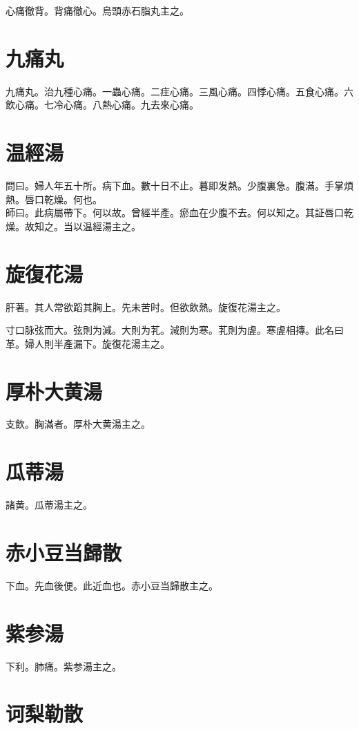 \documentclass[b5paper,twoside,zihao=-4,UTF8]{ctexbook}
\begin{document}
心痛徹背。背痛徹心。烏頭赤石脂丸主之。

\section{九痛丸}

九痛丸。治九種心痛。一蟲心痛。二疰心痛。三風心痛。四悸心痛。五食心痛。六飲心痛。七冷心痛。八熱心痛。九去來心痛。

\section{温經湯}

問曰。婦人年五十所。病下血。數十日不止。暮即发熱。少腹裏急。腹滿。手掌煩熱。唇口乾燥。何也。\\
師曰。此病屬帶下。何以故。曾經半產。瘀血在少腹不去。何以知之。其証唇口乾燥。故知之。当以温經湯主之。

\section{旋復花湯}

肝著。其人常欲蹈其胸上。先未苦时。但欲飲熱。旋復花湯主之。

寸口脉弦而大。弦則为減。大則为芤。減則为寒。芤則为虗。寒虗相摶。此名曰革。婦人則半產漏下。旋復花湯主之。

\section{厚朴大黄湯}

支飲。胸滿者。厚朴大黄湯主之。

\section{瓜蒂湯}

諸黄。瓜蒂湯主之。

\section{赤小豆当歸散}

下血。先血後便。此近血也。赤小豆当歸散主之。

\section{紫参湯}

下利。肺痛。紫参湯主之。

\section{诃梨勒散}
\end{document}
